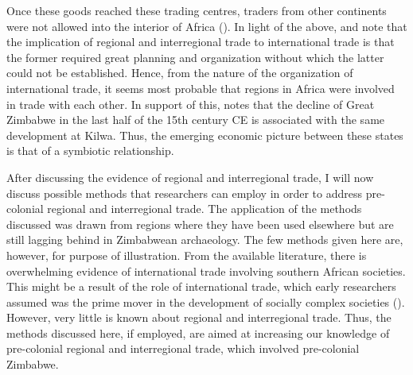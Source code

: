 Once these goods reached these trading centres, traders from other continents were not allowed into the interior of Africa (\cite[][]{alradi1990}). In light of the above, \textcite[][]{kusimba1999} and \textcite[][]{manyanga2006} note that the implication of regional and interregional trade to international trade is that the former required great planning and organization without which the latter could not be established. Hence, from the nature of the organization of international trade, it seems most probable that regions in Africa were involved in trade with each other. In support of this, \textcite[][]{pwiti2005} notes that the decline of Great Zimbabwe in the last half of the 15th century CE is associated with the same development at Kilwa. Thus, the emerging economic picture between these states is that of a symbiotic relationship.


After discussing the evidence of regional and interregional trade, I will now discuss possible methods that researchers can employ in order to address pre-colonial regional and interregional trade. The application of the methods discussed was drawn from regions where they have been used elsewhere but are still lagging behind in Zimbabwean archaeology. The few methods given here are, however, for purpose of illustration. From the available literature, there is overwhelming evidence of international trade involving southern African societies.  This might be a result of the role of international trade, which early researchers assumed was the prime mover in the development of socially complex societies (\cites[][]{huffman1972}[][]{huffman1982}[][]{huffman1986}[][]{huffman2009}). %
However, very little is known about regional and interregional trade. Thus, the methods discussed here, if employed, are aimed at increasing our knowledge of pre-colonial regional and interregional trade, which involved pre-colonial Zimbabwe.

